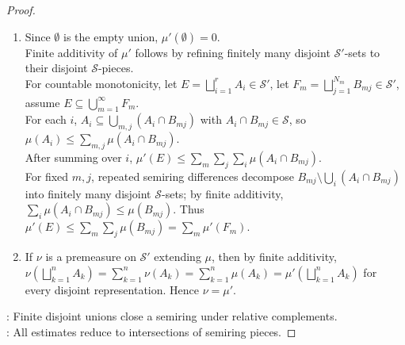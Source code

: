 \begin{proposition}
\begin{proof}
\begin{enumerate}[label=(\roman*)]
By finite additivity of $\mu$, $\sum\limits_{i=1}^{r}\mu(A_i)=\sum\limits_{i=1}^{r}\sum\limits_{j=1}^{s}\mu(A_i\cap B_j)=\sum\limits_{j=1}^{s}\mu(B_j)$, so $\mu'$ is well-defined.\\
If $A\in\mathcal{S}$, then $\mu'(A)=\mu(A)$ by the one-piece representation.
\item Since $\emptyset$ is the empty union, $\mu'(\emptyset)=0$.\\
Finite additivity of $\mu'$ follows by refining finitely many disjoint $\mathcal{S}'$-sets to their disjoint $\mathcal{S}$-pieces.\\
For countable monotonicity, let $E=\bigsqcup\limits_{i=1}^{r}A_i\in\mathcal{S}'$, let $F_m=\bigsqcup\limits_{j=1}^{N_m}B_{mj}\in\mathcal{S}'$, assume $E\subseteq\bigcup\limits_{m=1}^{\infty}F_m$.\\
For each $i$, $A_i\subseteq\bigcup\limits_{m,j}(A_i\cap B_{mj})$ with $A_i\cap B_{mj}\in\mathcal{S}$, so $\mu(A_i)\leq\sum\limits_{m,j}\mu(A_i\cap B_{mj})$.\\
After summing over $i$, $\mu'(E)\leq\sum\limits_m\sum\limits_j\sum\limits_i\mu(A_i\cap B_{mj})$.\\
For fixed $m,j$, repeated semiring differences decompose $B_{mj}\setminus\bigcup\limits_i(A_i\cap B_{mj})$ into finitely many disjoint $\mathcal{S}$-sets; by finite additivity, $\sum\limits_i\mu(A_i\cap B_{mj})\leq\mu(B_{mj})$. Thus $\mu'(E)\leq\sum\limits_m\sum\limits_j\mu(B_{mj})=\sum\limits_m\mu'(F_m)$.
\item If $\nu$ is a premeasure on $\mathcal{S}'$ extending $\mu$, then by finite additivity,\\
$\nu(\bigsqcup\limits_{k=1}^{n}A_k)=\sum\limits_{k=1}^{n}\nu(A_k)=\sum\limits_{k=1}^{n}\mu(A_k)=\mu'(\bigsqcup\limits_{k=1}^{n}A_k)$ for every disjoint representation. Hence $\nu=\mu'$.
\end{enumerate}
: Finite disjoint unions close a semiring under relative complements.\\
: All estimates reduce to intersections of semiring pieces.
\end{proof}
\end{proposition}

